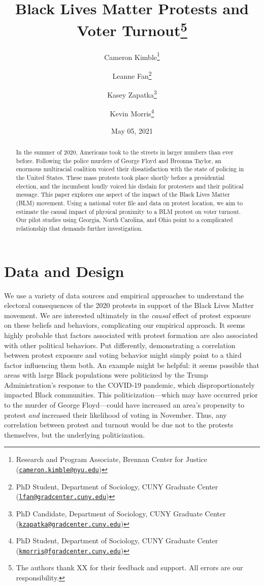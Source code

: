 \documentclass[
  12pt,
]{article}
\title{Black Lives Matter Protests and Voter Turnout\thanks{The authors thank XX for their feedback and support. All errors are our responsibility.}}
\author{Cameron Kimble\footnote{Research and Program Associate, Brennan Center for Justice (\href{mailto:cameron.kimble@nyu.edu}{\nolinkurl{cameron.kimble@nyu.edu}})} \and Leanne Fan\footnote{PhD Student, Department of Sociology, CUNY Graduate Center (\href{mailto:lfan@gradcenter.cuny.edu}{\nolinkurl{lfan@gradcenter.cuny.edu}})} \and Kasey Zapatka\footnote{PhD Candidate, Department of Sociology, CUNY Graduate Center (\href{mailto:kzapatka@gradcenter.cuny.edu}{\nolinkurl{kzapatka@gradcenter.cuny.edu}})} \and Kevin Morris\footnote{PhD Student, Department of Sociology, CUNY Graduate Center (\href{mailto:kmorris@fgradcenter.cuny.edu}{\nolinkurl{kmorris@fgradcenter.cuny.edu}})}}
\date{May 05, 2021}
\begin{document}
\maketitle
\begin{abstract}
In the summer of 2020, Americans took to the streets in larger numbers than ever before. Following the police murders of George Floyd and Breonna Taylor, an enormous multiracial coalition voiced their dissatisfaction with the state of policing in the United States. These mass protests took place shortly before a presidential election, and the incumbent loudly voiced his disdain for protesters and their political message. This paper explores one aspect of the impact of the Black Lives Matter (BLM) movement. Using a national voter file and data on protest location, we aim to estimate the causal impact of physical proximity to a BLM protest on voter turnout. Our pilot studies using Georgia, North Carolina, and Ohio point to a complicated relationship that demands further investigation.
\end{abstract}

\pagebreak
\doublespacing


\hypertarget{data-and-design}{%
\section*{Data and Design}\label{data-and-design}}

We use a variety of data sources and empirical approaches to understand the electoral consequences of the 2020 protests in support of the Black Lives Matter movement. We are interested ultimately in the \emph{causal} effect of protest exposure on these beliefs and behaviors, complicating our empirical approach. It seems highly probable that factors associated with protest formation are also associated with other political behaviors. Put differently, demonstrating a correlation between protest exposure and voting behavior might simply point to a third factor influencing them both. An example might be helpful: it seems possible that areas with large Black populations were politicized by the Trump Administration's response to the COVID-19 pandemic, which disproportionately impacted Black communities. This politicization---which may have occurred prior to the murder of George Floyd---could have increased an area's propensity to protest \emph{and} increased their likelihood of voting in November. Thus, any correlation between protest and turnout would be due not to the protests themselves, but the underlying politicization.
\end{document}
